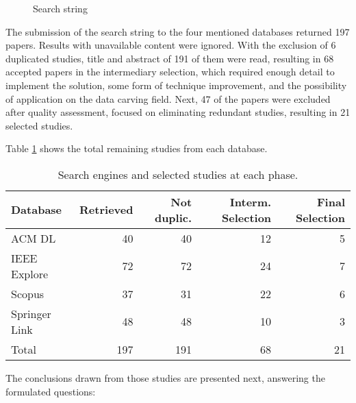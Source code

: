 \begin{figure}[!ht]
  \centering
  \caption{Search string}
  \label{fig:searchstring}
\end{figure}
	
The submission of the search string to the four mentioned databases returned 197 papers.
Results with unavailable content were ignored.
With the exclusion of 6 duplicated studies, title and abstract of 191 of them were read, resulting in 68 accepted papers in the intermediary selection, which required enough detail to implement the solution, some form of technique improvement, and the possibility of application on the data carving field.
Next, 47 of the papers were excluded after quality assessment, focused on eliminating redundant studies, resulting in 21 selected studies.

Table 
\ref{tab:results}
shows the total remaining studies from each database.


\begin{table}[!ht]
    \centering
    \caption{Search engines and selected studies at each phase.}
    \label{tab:results}
    \begin{tabular}{l r r r r}
    \hline
    Database &        Retrieved & 
                                Not duplic. & 
                                         Interm. Selection & 
                                               Final Selection\\
    \hline
    ACM	DL			& 40 &      40 &     12  & 5 \\
    IEEE Explore	& 72 &      72 &     24  & 7 \\
    Scopus			& 37 &      31 &     22  & 6 \\
    Springer Link	& 48 &      48 &     10  & 3 \\
    \hline
    Total           & 197 &    191 &     68  & 21 \\
    \hline
    
    \end{tabular}
\end{table}

The conclusions drawn from those studies are presented next, answering the formulated questions:

